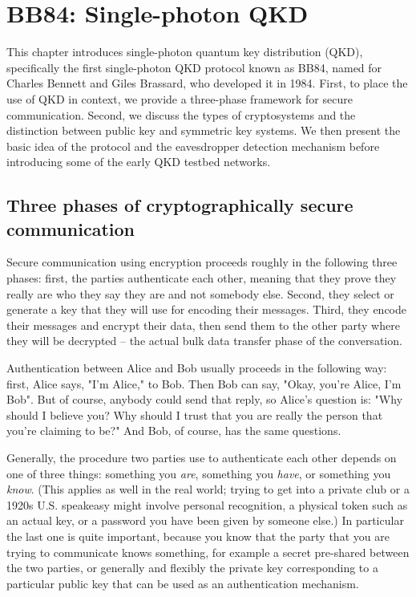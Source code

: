 \chapter{BB84: Single-photon QKD}
\label{sec:9_bb84}

This chapter introduces single-photon quantum key distribution (QKD), specifically the first single-photon QKD protocol known as BB84, named for Charles Bennett and Giles Brassard, who developed it in 1984. First, to place the use of QKD in context, we provide a three-phase framework for secure communication. Second, we discuss the types of cryptosystems and the distinction between public key and symmetric key systems. We then present the basic idea of the protocol and the eavesdropper detection mechanism before introducing some of the early QKD testbed networks.

\section{Three phases of cryptographically secure communication}
\label{sec:crypto-phases}


Secure communication using encryption proceeds roughly in the following three phases: first, the parties authenticate each other, meaning that they prove they really are who they say they are and not somebody else. Second, they select or generate a key that they will use for encoding their messages.  Third, they encode their messages and encrypt their data, then send them to the other party where they will be decrypted -- the actual bulk data transfer phase of the conversation.

Authentication between Alice and Bob usually proceeds in the following way: first, Alice says, "I'm Alice," to Bob. Then Bob can say, "Okay, you're Alice, I'm Bob". But of course, anybody could send that reply, so Alice's question is: "Why should I believe you? Why should I trust that you are really the person that you're claiming to be?" And Bob, of course, has the same questions.

Generally, the procedure two parties use to authenticate each other depends on one of three things: something you \emph{are}, something you \emph{have}, or something you \emph{know}. (This applies as well in the real world; trying to get into a private club or a 1920s U.S. speakeasy might involve personal recognition, a physical token such as an actual key, or a password you have been given by someone else.)  In particular the last one is quite important, because you know that the party that you are trying to communicate knows something, for example a secret pre-shared between the two parties, or generally and flexibly the private key corresponding to a particular public key that can be used as an authentication mechanism.

